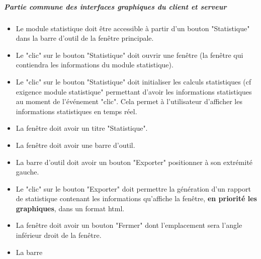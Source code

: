 \documentclass[10pt,a4paper]{report}
\begin{document}
\subparagraph{\textbf{Partie commune des interfaces graphiques du client et serveur }}
\begin{itemize}[label = $\triangleright$]

\item Le module statistique doit être accessible à partir d'un bouton "Statistique" dans la barre d'outil de la fenêtre principale.

\item Le "clic" sur le bouton "Statistique" doit ouvrir une fenêtre (la fenêtre qui contiendra les informations du module statistique).

\item Le "clic" sur le bouton "Statistique" doit initialiser les calculs statistiques (cf exigence module statistique" permettant d'avoir les informations statistiques au moment de l'événement "clic". Cela permet à l'utilisateur d'afficher les informations statistiques en temps réel.

\item La fenêtre doit avoir un titre "Statistique".

\item La fenêtre doit avoir une barre d'outil.

\item La barre d'outil doit avoir un bouton "Exporter" positionner à son extrémité gauche.

\item Le "clic" sur le bouton "Exporter" doit permettre la génération d'un rapport de statistique contenant les informations qu'affiche la fenêtre, \textbf{en priorité les graphiques}, dans un format html.

\item La fenêtre doit avoir un bouton "Fermer" dont l'emplacement sera l'angle inférieur droit de la fenêtre. 

\item La barre
\end{itemize}
\end{document}
